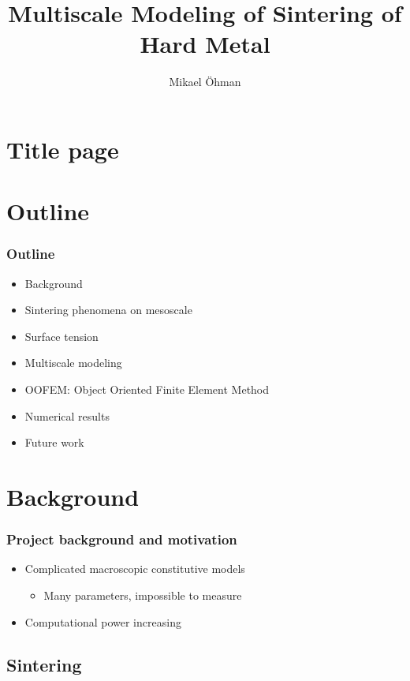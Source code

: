 \documentclass[11pt,mathserif]{beamer}
\title{Multiscale Modeling of Sintering of Hard Metal}
\author{Mikael Öhman}
\institute{Chalmers University of Technology}
\begin{document}
\section{Title page}
\begin{frame}[plain]
 \titlepage
\end{frame}

\section{Outline}
\begin{frame}
 \frametitle{Outline}

\begin{itemize}
 \item Background
 \item Sintering phenomena on mesoscale
 \item Surface tension
 \item Multiscale modeling
 \item OOFEM: Object Oriented Finite Element Method
 \item Numerical results
 \item Future work
\end{itemize}
\end{frame}

\section{Background}
\begin{frame}
 \frametitle{Project background and motivation}
 \begin{itemize}
  \item Complicated macroscopic constitutive models
  \begin{itemize}
    \item Many parameters, impossible to measure
  \end{itemize}
  \item Computational power increasing
 \end{itemize}
\end{frame}

\subsection{Sintering}
\end{document}
